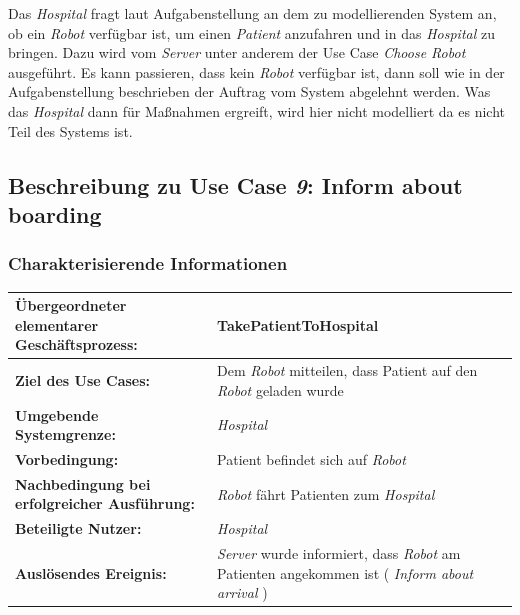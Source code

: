			Das \emph{Hospital} fragt laut Aufgabenstellung an dem zu modellierenden System an, ob ein \emph{Robot} verfügbar ist, um einen \emph{Patient} anzufahren und in das \emph{Hospital} zu bringen. 
			Dazu wird vom \emph{Server} unter anderem der Use Case \emph{Choose Robot} ausgeführt. 
			Es kann passieren, dass kein \emph{Robot} verfügbar ist, dann soll wie in der Aufgabenstellung beschrieben der Auftrag vom System abgelehnt werden. 
			Was das \emph{Hospital} dann für Maßnahmen ergreift, wird hier nicht modelliert da es nicht Teil des Systems ist.


	\pagebreak
		\subsection{Beschreibung zu Use Case \emph{9}: Inform about boarding}

			\subsubsection*{Charakterisierende Informationen}

			\begin{table}[H]
				\centering
				\begin{tabularx}{\textwidth}{|p{5cm}|X|}
				\hline
				\textbf{Übergeordneter elementarer Geschäftsprozess:} & TakePatientToHospital   \\ \hline
				\textbf{Ziel des Use Cases:} & Dem \emph{Robot} mitteilen, dass Patient auf den \emph{Robot} geladen wurde \\ \hline
				\textbf{Umgebende Systemgrenze:} & \emph{Hospital} \\ \hline
				\textbf{Vorbedingung:} & Patient befindet sich auf \emph{Robot}\\ \hline
				\textbf{Nachbedingung bei erfolgreicher Ausführung:} & \emph{Robot} fährt Patienten zum \emph{Hospital} \\ \hline
				\textbf{Beteiligte Nutzer:} & \emph{Hospital}\\ \hline
				\textbf{Auslösendes Ereignis:} & \emph{Server} wurde informiert, dass \emph{Robot} am Patienten angekommen ist (\textit{ \glqq Inform about arrival \grqq }) \\
				\hline
				\end{tabularx}
			\end{table}
			
